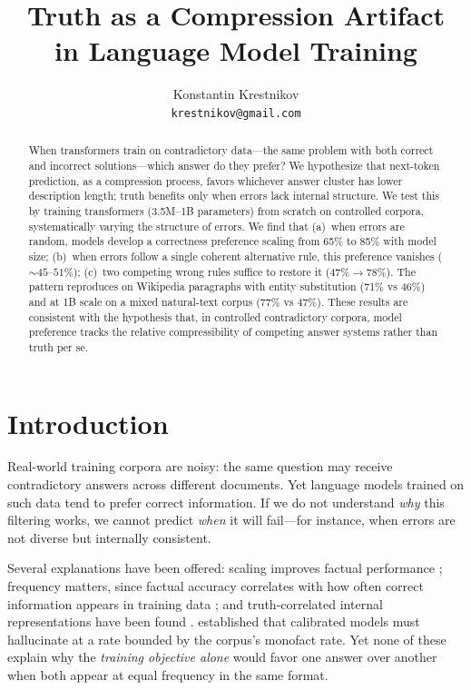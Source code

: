 \documentclass{article}
\title{Truth as a Compression Artifact\\in Language Model Training}
\author{Konstantin Krestnikov\\
\texttt{krestnikov@gmail.com}}
\date{}
\begin{document}
\maketitle

\begin{abstract}
When transformers train on contradictory data---the same problem with both correct and incorrect solutions---which answer do they prefer? We hypothesize that next-token prediction, as a compression process, favors whichever answer cluster has lower description length; truth benefits only when errors lack internal structure. We test this by training transformers (3.5M--1B parameters) from scratch on controlled corpora, systematically varying the structure of errors. We find that (a)~when errors are random, models develop a correctness preference scaling from 65\% to 85\% with model size; (b)~when errors follow a single coherent alternative rule, this preference vanishes (${\sim}45$--$51\%$); (c)~two competing wrong rules suffice to restore it ($47\% \to 78\%$). The pattern reproduces on Wikipedia paragraphs with entity substitution (71\% vs 46\%) and at 1B scale on a mixed natural-text corpus (77\% vs 47\%). These results are consistent with the hypothesis that, in controlled contradictory corpora, model preference tracks the relative compressibility of competing answer systems rather than truth per se.
\end{abstract}

\section{Introduction}

Real-world training corpora are noisy: the same question may receive contradictory answers across different documents. Yet language models trained on such data tend to prefer correct information. If we do not understand \emph{why} this filtering works, we cannot predict \emph{when} it will fail---for instance, when errors are not diverse but internally consistent.

Several explanations have been offered: scaling improves factual performance \citep{kadavath2022language}; frequency matters, since factual accuracy correlates with how often correct information appears in training data \citep{elazar2022measuring,joshi2024personas,kandpal2023large}; and truth-correlated internal representations have been found \citep{burns2023discovering,marks2024geometry,burger2024truth}. \citet{kalai2024calibrated} established that calibrated models must hallucinate at a rate bounded by the corpus's monofact rate. Yet none of these explain why the \emph{training objective alone} would favor one answer over another when both appear at equal frequency in the same format.
\end{document}
